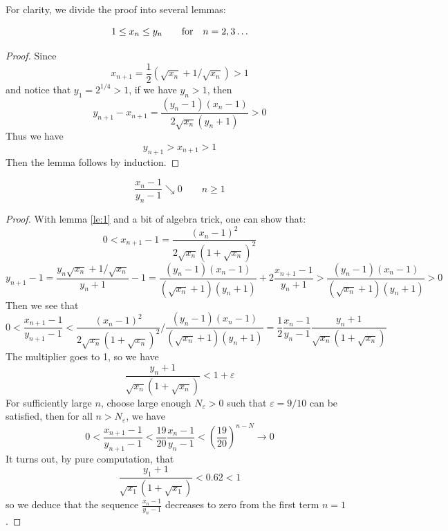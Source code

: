 \documentclass{report}
\begin{document}
\begin{titlepage}
For clarity, we divide the proof into several lemmas:
\begin{lemma}\label{le:1}%
\[
1\leq x_n\leq y_n\qquad{\rm for}\quad n=2,3\ldots
\]
\end{lemma}
\begin{proof}
Since
\[ x_{n+1}=\frac{1}{2}(\sqrt{x_n}+1/\sqrt{x_n})>1\]
and notice that $y_1=2^{1/4}>1$, if we have $y_n>1$, then
\[
y_{n+1}-x_{n+1}=\frac{(y_n-1)(x_n-1)}{2\sqrt{x_n}(y_n+1)}>0
\]
Thus we have
\[
y_{n+1}>x_{n+1}>1
\]
Then the lemma follows by induction.
\end{proof}
\begin{lemma}\label{le:2}
\[
\frac{x_n-1}{y_n-1}\searrow0\qquad n\ge1
\]
\end{lemma}
\begin{proof}
With lemma \ref{le:1} and a bit of algebra trick, one can show that:
\[
0<x_{n+1}-1=\frac{(x_n-1)^2}{2\sqrt{x_n}(1+\sqrt{x_n})^2}
\]
\[
y_{n+1}-1=\frac{y_n\sqrt{x_n}+1/\sqrt{x_n}}{y_n+1}-1=\frac{(y_n-1)(x_n-1)}{(\sqrt{x_n}+1)(y_n+1)}+2\frac{x_{n+1}-1}{y_n+1}>\frac{(y_n-1)(x_n-1)}{(\sqrt{x_n}+1)(y_n+1)}>0
\]
Then we see that
\[
0<\frac{x_{n+1}-1}{y_{n+1}-1}<\frac{(x_n-1)^2}{2\sqrt{x_n}(1+\sqrt{x_n})^2}\Big/\frac{(y_n-1)(x_n-1)}{(\sqrt{x_n}+1)(y_n+1)}=\frac{1}{2}\frac{x_n-1}{y_n-1}\frac{y_n+1}{\sqrt{x_n}(1+\sqrt{x_n})}
\]
The multiplier goes to 1, so we have
\[
\frac{y_n+1}{\sqrt{x_n}(1+\sqrt{x_n})}<1+\varepsilon
\]
For sufficiently large $n$, choose large enough $N_{\varepsilon}>0$ such that $\varepsilon=9/10$ can be satisfied, then for all $n>N_{\varepsilon}$, we have
\[
0<\frac{x_{n+1}-1}{y_{n+1}-1}<\frac{19}{20}\frac{x_n-1}{y_n-1}<\left(\frac{19}{20}\right)^{n-N}\to 0
\]
It turns out, by pure computation, that
\[
\frac{y_1+1}{\sqrt{x_1}(1+\sqrt{x_1})}<0.62<1
\]
so we deduce that the sequence $\frac{x_n-1}{y_n-1}$ decreases to zero from the first term $n=1$.
\end{proof}\bigskip


\end{titlepage}
\end{document}
